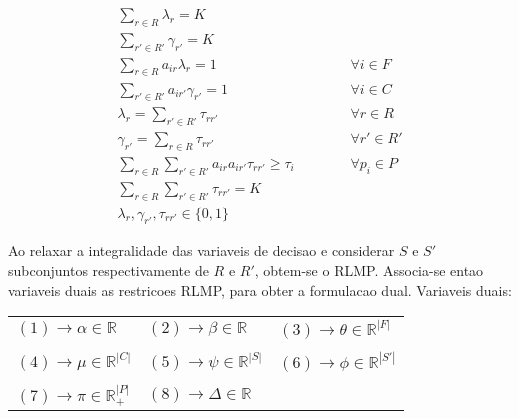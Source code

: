 \documentclass[12pt]{article}
\begin{document}
\begin{eqnarray}
\label{eqA01}
  \sum\limits_{r \in R} {\lambda_r} = K  \\
\label{eqA02}
  \sum\limits_{r' \in R'} {\gamma_{r'}} = K  \\
\label{eqA03}
  \sum\limits_{r \in R} {a_{ir} \lambda_r} = 1 & \hspace{1cm} & \forall i \in F \\
\label{eqA04}
  \sum\limits_{r' \in R'} {a_{ir'} \gamma_{r'}} = 1 & \hspace{1cm} & \forall i \in C \\
\label{eqA05}
  \lambda_r = \sum\limits_{r' \in R'}{\tau_{rr'}} & \hspace{1cm} & \forall r \in R \\
\label{eqA06}
  \gamma_{r'} = \sum\limits_{r \in R}{\tau_{rr'}} & \hspace{1cm} & \forall r' \in R' \\
\label{eqA07}
  \sum\limits_{r \in R}{\sum\limits_{r' \in R'}{a_{ir}a_{ir'}\tau_{rr'} \geq \tau_i}} & \hspace{1cm} & \forall p_i \in P \\
\label{eqA08}
  \sum\limits_{r \in R}{\sum\limits_{r' \in R'}{\tau_{rr'}}} = K  \\
\label{eqA09}
  \lambda_r, \gamma_{r'}, \tau_{rr'} \in \{0,1\} 
\end{eqnarray}

\vspace{2.5cm}
Ao relaxar a integralidade das variaveis de decisao e considerar $S$ e $S'$ subconjuntos respectivamente de $R$ e $R'$, obtem-se o RLMP. Associa-se entao variaveis duais as restricoes RLMP, para obter a formulacao dual. Variaveis duais:
\begin{table}[!htb]
\begin{center}
\begin{tabular}{lll}
$(1) \rightarrow \alpha \in \mathbb{R}$ & $(2) \rightarrow \beta \in \mathbb{R}$ & $(3) \rightarrow \theta \in \mathbb{R}^{|F|}$ \\
 & & \\
$(4) \rightarrow \mu \in \mathbb{R}^{|C|}$ & $(5) \rightarrow \psi \in \mathbb{R}^{|S|}$ & $(6) \rightarrow \phi \in \mathbb{R}^{|S'|}$ \\
 & & \\
$(7) \rightarrow \pi \in \mathbb{R}^{|P|}_+$ & $(8) \rightarrow \Delta \in \mathbb{R}$
\end{tabular}
\end{center}
\end{table}
\end{document}
